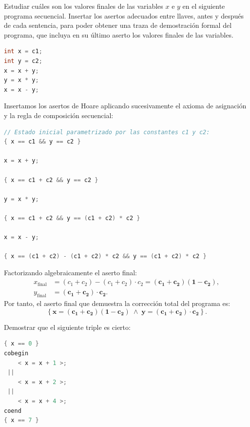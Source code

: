 \begin{ejercicio}
Estudiar cuáles son los valores finales de las variables $x$ e $y$ en el siguiente programa secuencial. Insertar los asertos adecuados entre llaves, antes y después de cada sentencia, para poder obtener una traza de demostración formal del programa, que incluya en su último aserto los valores finales de las variables.
\begin{lstlisting}[language=C++]
int x = c1;
int y = c2;
x = x + y;
y = x * y;
x = x - y;
\end{lstlisting}
\end{ejercicio}

\begin{solucion}
Insertamos los asertos de Hoare aplicando sucesivamente el axioma de asignación y la regla de composición secuencial:

\begin{lstlisting}[language=C++]
// Estado inicial parametrizado por las constantes c1 y c2:
{ x == c1 && y == c2 }

x = x + y;

{ x == c1 + c2 && y == c2 }

y = x * y;

{ x == c1 + c2 && y == (c1 + c2) * c2 }

x = x - y;

{ x == (c1 + c2) - (c1 + c2) * c2 && y == (c1 + c2) * c2 }
\end{lstlisting}

Factorizando algebraicamente el aserto final:
\begin{align*}
x_{\text{final}} &= (c_1 + c_2) - (c_1 + c_2) \cdot c_2 = \mathbf{(c_1 + c_2)(1 - c_2)}, \\
y_{\text{final}} &= \mathbf{(c_1 + c_2) \cdot c_2}.
\end{align*}
Por tanto, el aserto final que demuestra la corrección total del programa es:
\[
\mathbf{\left\{ x = (c_1 + c_2)(1 - c_2) \;\land\; y = (c_1 + c_2) \cdot c_2 \right\}}.
\]
\end{solucion}

\begin{ejercicio}
Demostrar que el siguiente triple es cierto:
\begin{lstlisting}[language=C++]
{ x == 0 }
cobegin
    < x = x + 1 >;
 ||
    < x = x + 2 >;
 ||
    < x = x + 4 >;
coend
{ x == 7 }
\end{lstlisting}
\end{ejercicio}

